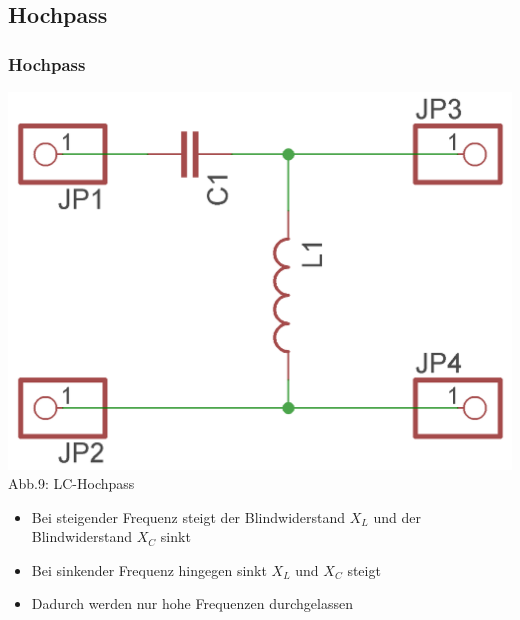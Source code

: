 \subsection*{Hochpass}
\begin{frame}
\frametitle{Hochpass}
\begin{center}
	\includegraphics[width=\textwidth,height=.5\textheight,keepaspectratio]{e07/LC-Hochpass.png}\\
	Abb.9: LC-Hochpass
\end{center}
\begin{itemize}
	\item Bei steigender Frequenz steigt der Blindwiderstand $X_L$ und der Blindwiderstand $X_C$ sinkt
	\item Bei sinkender Frequenz hingegen sinkt $X_L$ und $X_C$ steigt
	\item Dadurch werden nur hohe Frequenzen durchgelassen 
\end{itemize}
\end{frame}

